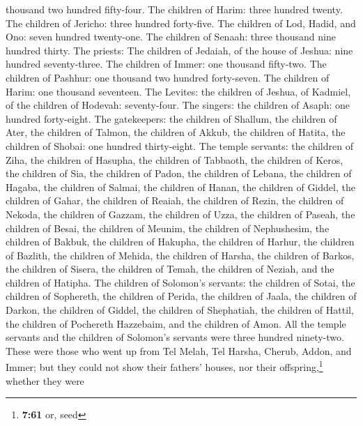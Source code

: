 thousand two hundred fifty-four.  The children of Harim:
three hundred twenty.  The children of Jericho: three
hundred forty-five.  The children of Lod, Hadid, and Ono:
seven hundred twenty-one.  The children of Senaah: three
thousand nine hundred thirty.  The priests: The children
of Jedaiah, of the house of Jeshua: nine hundred seventy-three.
 The children of Immer: one thousand fifty-two.
 The children of Pashhur: one thousand two hundred
forty-seven.  The children of Harim: one thousand
seventeen.  The Levites: the children of Jeshua, of
Kadmiel, of the children of Hodevah: seventy-four.  The
singers: the children of Asaph: one hundred forty-eight. 
The gatekeepers: the children of Shallum, the children of Ater, the
children of Talmon, the children of Akkub, the children of Hatita, the
children of Shobai: one hundred thirty-eight.  The temple
servants: the children of Ziha, the children of Hasupha, the children of
Tabbaoth,  the children of Keros, the children of Sia,
the children of Padon,  the children of Lebana, the
children of Hagaba, the children of Salmai,  the children
of Hanan, the children of Giddel, the children of Gahar, 
the children of Reaiah, the children of Rezin, the children of Nekoda,
 the children of Gazzam, the children of Uzza, the
children of Paseah,  the children of Besai, the children
of Meunim, the children of Nephushesim,  the children of
Bakbuk, the children of Hakupha, the children of Harhur, 
the children of Bazlith, the children of Mehida, the children of Harsha,
 the children of Barkos, the children of Sisera, the
children of Temah,  the children of Neziah, and the
children of Hatipha.  The children of Solomon's servants:
the children of Sotai, the children of Sophereth, the children of
Perida,  the children of Jaala, the children of Darkon,
the children of Giddel,  the children of Shephatiah, the
children of Hattil, the children of Pochereth Hazzebaim, and the
children of Amon.  All the temple servants and the
children of Solomon's servants were three hundred ninety-two.
 These were those who went up from Tel Melah, Tel Harsha,
Cherub, Addon, and Immer; but they could not show their fathers' houses,
nor their offspring,\footnote{\textbf{7:61} or, seed} whether they were
